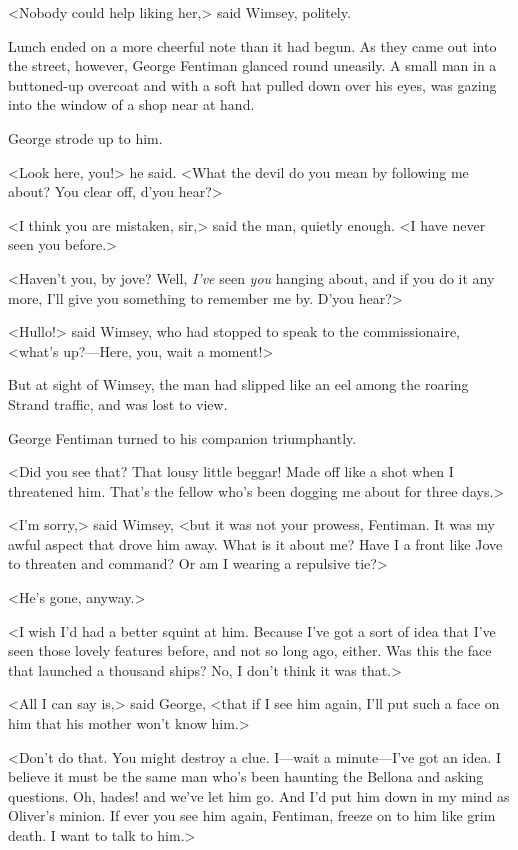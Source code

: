 <Nobody could help liking her,> said Wimsey, politely.

Lunch ended on a more cheerful note than it had begun. As they came out into the street, however, George Fentiman glanced round uneasily. A small man in a buttoned-up overcoat and with a soft hat pulled down over his eyes, was gazing into the window of a shop near at hand.

George strode up to him.

<Look here, you!> he said. <What the devil do you mean by following me about? You clear off, d'you hear?>

<I think you are mistaken, sir,> said the man, quietly enough. <I have never seen you before.>

<Haven't you, by jove? Well, \emph{I've} seen \emph{you} hanging about, and if you do it any more, I'll give you something to remember me by. D'you hear?>

<Hullo!> said Wimsey, who had stopped to speak to the commissionaire, <what's up?—Here, you, wait a moment!>

But at sight of Wimsey, the man had slipped like an eel among the roaring Strand traffic, and was lost to view.

George Fentiman turned to his companion triumphantly.

<Did you see that? That lousy little beggar! Made off like a shot when I threatened him. That's the fellow who's been dogging me about for three days.>

<I'm sorry,> said Wimsey, <but it was not your prowess, Fentiman. It was my awful aspect that drove him away. What is it about me? Have I a front like Jove to threaten and command? Or am I wearing a repulsive tie?>

<He's gone, anyway.>

<I wish I'd had a better squint at him. Because I've got a sort of idea that I've seen those lovely features before, and not so long ago, either. Was this the face that launched a thousand ships? No, I don't think it was that.>

<All I can say is,> said George, <that if I see him again, I'll put such a face on him that his mother won't know him.>

<Don't do that. You might destroy a clue. I—wait a minute—I've got an idea. I believe it must be the same man who's been haunting the Bellona and asking questions. Oh, hades! and we've let him go. And I'd put him down in my mind as Oliver's minion. If ever you see him again, Fentiman, freeze on to him like grim death. I want to talk to him.>